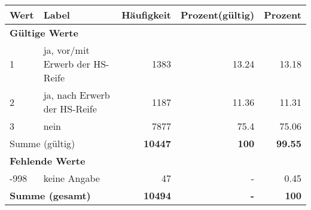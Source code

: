      \begin{longtable}{lXrrr}
     \toprule
     \textbf{Wert} & \textbf{Label} & \textbf{Häufigkeit} & \textbf{Prozent(gültig)} & \textbf{Prozent} \\
     \endhead
     \midrule
     \multicolumn{5}{l}{\textbf{Gültige Werte}}\\

     1 &
     \multicolumn{1}{X}{ ja, vor/mit Erwerb der HS-Reife   } &


       \num{1383} &
       \num[round-mode=places,round-precision=2]{13,24} &
         \num[round-mode=places,round-precision=2]{13,18} \\

     2 &
     \multicolumn{1}{X}{ ja, nach Erwerb der HS-Reife   } &


       \num{1187} &
       \num[round-mode=places,round-precision=2]{11,36} &
         \num[round-mode=places,round-precision=2]{11,31} \\

     3 &
     \multicolumn{1}{X}{ nein   } &


       \num{7877} &
       \num[round-mode=places,round-precision=2]{75,4} &
         \num[round-mode=places,round-precision=2]{75,06} \\
     \midrule
     \multicolumn{2}{l}{Summe (gültig)} &
       \textbf{\num{10447}} &
     \textbf{100} &
       \textbf{\num[round-mode=places,round-precision=2]{99,55}} \\
     \multicolumn{5}{l}{\textbf{Fehlende Werte}}\\
       -998 &
       keine Angabe &
         \num{47} &
        - &
         \num[round-mode=places,round-precision=2]{0,45} \\
     \midrule
     \multicolumn{2}{l}{\textbf{Summe (gesamt)}} &
          \textbf{\num{10494}} &
        \textbf{-} &
        \textbf{100} \\
     \bottomrule
     \end{longtable}
     

